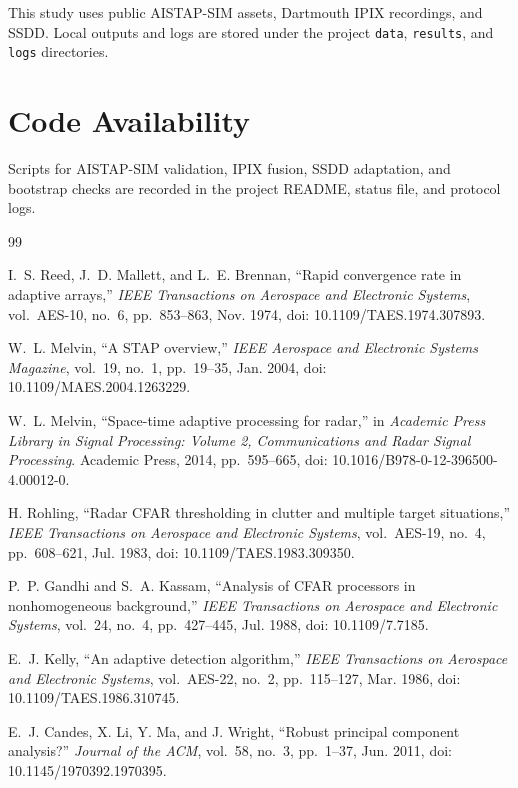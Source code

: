 \documentclass[journal]{IEEEtran}
\begin{document}
This study uses public AISTAP-SIM assets, Dartmouth IPIX recordings, and SSDD. Local outputs and logs are stored under the project \texttt{data}, \texttt{results}, and \texttt{logs} directories.

\section*{Code Availability}

Scripts for AISTAP-SIM validation, IPIX fusion, SSDD adaptation, and bootstrap checks are recorded in the project README, status file, and protocol logs.

\begingroup
\fontsize{7.5}{8.5}\selectfont
\begin{thebibliography}{99}

I.~S. Reed, J.~D. Mallett, and L.~E. Brennan, ``Rapid convergence rate in adaptive arrays,'' \emph{IEEE Transactions on Aerospace and Electronic Systems}, vol.~AES-10, no.~6, pp.~853--863, Nov. 1974, doi: 10.1109/TAES.1974.307893.

W.~L. Melvin, ``A STAP overview,'' \emph{IEEE Aerospace and Electronic Systems Magazine}, vol.~19, no.~1, pp.~19--35, Jan. 2004, doi: 10.1109/MAES.2004.1263229.

W.~L. Melvin, ``Space-time adaptive processing for radar,'' in \emph{Academic Press Library in Signal Processing: Volume 2, Communications and Radar Signal Processing}. Academic Press, 2014, pp.~595--665, doi: 10.1016/B978-0-12-396500-4.00012-0.

H. Rohling, ``Radar CFAR thresholding in clutter and multiple target situations,'' \emph{IEEE Transactions on Aerospace and Electronic Systems}, vol.~AES-19, no.~4, pp.~608--621, Jul. 1983, doi: 10.1109/TAES.1983.309350.

P.~P. Gandhi and S.~A. Kassam, ``Analysis of CFAR processors in nonhomogeneous background,'' \emph{IEEE Transactions on Aerospace and Electronic Systems}, vol.~24, no.~4, pp.~427--445, Jul. 1988, doi: 10.1109/7.7185.

E.~J. Kelly, ``An adaptive detection algorithm,'' \emph{IEEE Transactions on Aerospace and Electronic Systems}, vol.~AES-22, no.~2, pp.~115--127, Mar. 1986, doi: 10.1109/TAES.1986.310745.

E.~J. Candes, X. Li, Y. Ma, and J. Wright, ``Robust principal component analysis?'' \emph{Journal of the ACM}, vol.~58, no.~3, pp.~1--37, Jun. 2011, doi: 10.1145/1970392.1970395.


\end{thebibliography}
\end{document}
